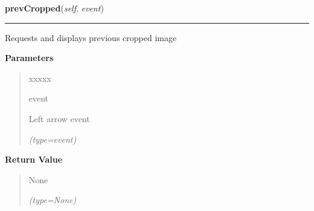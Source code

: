 \hspace{.8\funcindent}\begin{boxedminipage}{\funcwidth}

    \raggedright \textbf{prevCropped}(\textit{self}, \textit{event})

    \vspace{-1.5ex}

    \rule{\textwidth}{0.5\fboxrule}
\setlength{\parskip}{2ex}
    Requests and displays previous cropped image

\setlength{\parskip}{1ex}
      \textbf{Parameters}
      \vspace{-1ex}

      \begin{quote}
        \begin{Ventry}{xxxxx}

          \item[event]

          Left arrow event

            {\it (type=event)}

        \end{Ventry}

      \end{quote}

      \textbf{Return Value}
    \vspace{-1ex}

      \begin{quote}
      None

      {\it (type=None)}

      \end{quote}

    \end{boxedminipage}

    \label{client_gui:GuiClass:submitClassification}

    \vspace{0.5ex}

